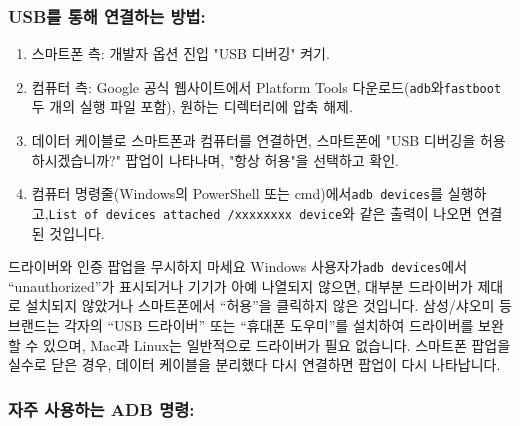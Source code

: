 \subsubsection*{USB를 통해 연결하는 방법:}

\begin{enumerate}
  \item 스마트폰 측: 개발자 옵션 진입 "USB 디버깅" 켜기.
  \item 컴퓨터 측: Google 공식 웹사이트에서 Platform Tools 다운로드(\texttt{adb}와\texttt{fastboot}두 개의 실행 파일 포함), 원하는 디렉터리에 압축 해제.
  \item 데이터 케이블로 스마트폰과 컴퓨터를 연결하면, 스마트폰에 "USB 디버깅을 허용하시겠습니까?" 팝업이 나타나며, "항상 허용"을 선택하고 확인.
  \item 컴퓨터 명령줄(Windows의 PowerShell 또는 cmd)에서\texttt{adb devices}를 실행하고,\texttt{List of devices attached /\allowbreak  xxxxxxxx device}와 같은 출력이 나오면 연결된 것입니다.
\end{enumerate}

\begin{tcbwarn}{드라이버와 인증 팝업을 무시하지 마세요}
Windows 사용자가\texttt{adb devices}에서 “unauthorized”가 표시되거나 기기가 아예 나열되지 않으면, 대부분 드라이버가 제대로 설치되지 않았거나 스마트폰에서 “허용”을 클릭하지 않은 것입니다. 삼성/샤오미 등 브랜드는 각자의 “USB 드라이버” 또는 “휴대폰 도우미”를 설치하여 드라이버를 보완할 수 있으며, Mac과 Linux는 일반적으로 드라이버가 필요 없습니다. 스마트폰 팝업을 실수로 닫은 경우, 데이터 케이블을 분리했다 다시 연결하면 팝업이 다시 나타납니다.

\end{tcbwarn}

\subsubsection*{자주 사용하는 ADB 명령:}


